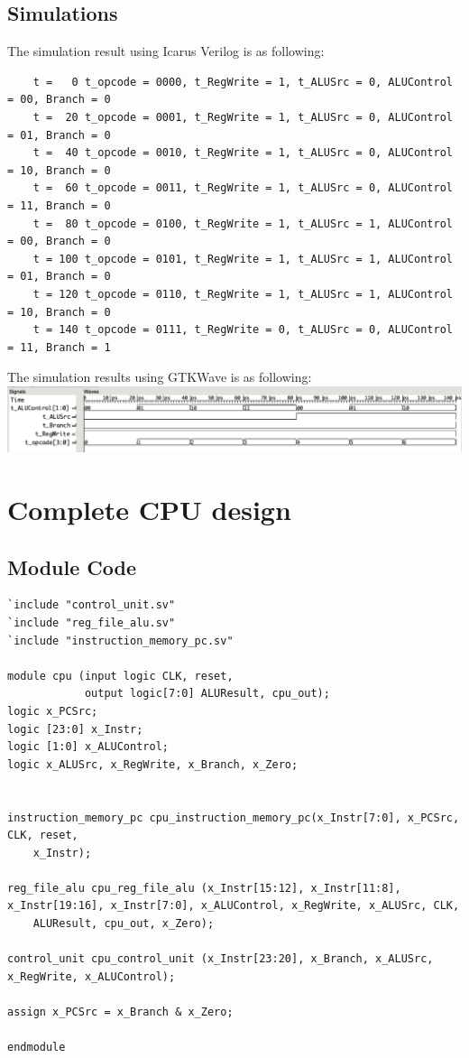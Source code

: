 \documentclass{article}
\begin{document}
\subsection{Simulations}
The simulation result using Icarus Verilog is as following:
\begin{Verbatim}
    t =   0 t_opcode = 0000, t_RegWrite = 1, t_ALUSrc = 0, ALUControl = 00, Branch = 0
    t =  20 t_opcode = 0001, t_RegWrite = 1, t_ALUSrc = 0, ALUControl = 01, Branch = 0
    t =  40 t_opcode = 0010, t_RegWrite = 1, t_ALUSrc = 0, ALUControl = 10, Branch = 0
    t =  60 t_opcode = 0011, t_RegWrite = 1, t_ALUSrc = 0, ALUControl = 11, Branch = 0
    t =  80 t_opcode = 0100, t_RegWrite = 1, t_ALUSrc = 1, ALUControl = 00, Branch = 0
    t = 100 t_opcode = 0101, t_RegWrite = 1, t_ALUSrc = 1, ALUControl = 01, Branch = 0
    t = 120 t_opcode = 0110, t_RegWrite = 1, t_ALUSrc = 1, ALUControl = 10, Branch = 0
    t = 140 t_opcode = 0111, t_RegWrite = 0, t_ALUSrc = 0, ALUControl = 11, Branch = 1
\end{Verbatim}
The simulation results using GTKWave is as following:\vspace{5pt}\\
\includegraphics[width=\textwidth]{control_unit.png}


\newpage
\section{Complete CPU design}
\subsection{Module Code}
\begin{lstlisting}
`include "control_unit.sv"
`include "reg_file_alu.sv"
`include "instruction_memory_pc.sv"

module cpu (input logic CLK, reset,
            output logic[7:0] ALUResult, cpu_out);
logic x_PCSrc;
logic [23:0] x_Instr;
logic [1:0] x_ALUControl;
logic x_ALUSrc, x_RegWrite, x_Branch, x_Zero;


instruction_memory_pc cpu_instruction_memory_pc(x_Instr[7:0], x_PCSrc, CLK, reset, 
    x_Instr);

reg_file_alu cpu_reg_file_alu (x_Instr[15:12], x_Instr[11:8], x_Instr[19:16], x_Instr[7:0], x_ALUControl, x_RegWrite, x_ALUSrc, CLK, 
    ALUResult, cpu_out, x_Zero);

control_unit cpu_control_unit (x_Instr[23:20], x_Branch, x_ALUSrc, x_RegWrite, x_ALUControl);

assign x_PCSrc = x_Branch & x_Zero;

endmodule
\end{lstlisting}
\end{document}
